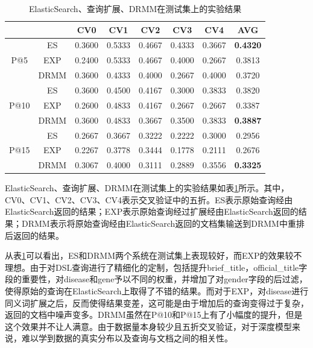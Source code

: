 \documentclass[a4paper]{article}
\begin{document}
\begin{table}[ht]
\centering
\caption{ElasticSearch、查询扩展、DRMM在测试集上的实验结果}\label{tab:results}
\begin{tabular}{cccccccc}\hline
                      &      & CV0    & CV1    & CV2    & CV3    & CV4    & AVG             \\ \hline
\multirow{3}{*}{P@5}  & ES   & 0.3600 & 0.5333 & 0.4667 & 0.4333 & 0.3667 & \textbf{0.4320} \\
                      & EXP  & 0.2400 & 0.5333 & 0.4667 & 0.4000 & 0.2667 & 0.3813          \\
                      & DRMM & 0.3600 & 0.4333 & 0.4000 & 0.2667 & 0.4000 & 0.3720          \\ \hline
\multirow{3}{*}{P@10} & ES   & 0.3600 & 0.4500 & 0.4167 & 0.3000 & 0.3833 & 0.3820          \\
                      & EXP  & 0.2600 & 0.4833 & 0.4167 & 0.2667 & 0.2667 & 0.3387          \\
                      & DRMM & 0.3600 & 0.4833 & 0.3667 & 0.3500 & 0.3833 & \textbf{0.3887} \\ \hline
\multirow{3}{*}{P@15} & ES   & 0.2667 & 0.3667 & 0.3222 & 0.2222 & 0.3000 & 0.2956          \\
                      & EXP  & 0.2267 & 0.3778 & 0.3444 & 0.1778 & 0.2111 & 0.2676          \\
                      & DRMM & 0.3067 & 0.4000 & 0.3111 & 0.2889 & 0.3556 & \textbf{0.3325}\\ \hline
\end{tabular}
\end{table}

ElasticSearch、查询扩展、DRMM在测试集上的实验结果如表\ref{tab:results}所示。其中，CV0、CV1、CV2、CV3、CV4表示交叉验证中的五折。ES表示原始查询经由ElasticSearch返回的结果；EXP表示原始查询经过扩展经由ElasticSearch返回的结果；DRMM表示将原始查询经由ElasticSearch返回的文档集输送到DRMM中重排后返回的结果。

从表\ref{tab:results}可以看出，ES和DRMM两个系统在测试集上表现较好，而EXP的效果较不理想。由于对DSL查询进行了精细化的定制，包括提升brief\_title，official\_title字段的重要性，对disease和gene予以不同的权重，并增加了对gender字段的后过滤，使得原始的查询在ElasticSearch上取得了不错的结果。而对于EXP，对disease进行同义词扩展之后，反而使得结果变差，这可能是由于增加后的查询变得过于复杂，返回的文档中噪声变多。DRMM虽然在P@10和P@15上有了小幅度的提升，但是这个效果并不让人满意。由于数据量本身较少且五折交叉验证，对于深度模型来说，难以学到数据的真实分布以及查询与文档之间的相关性。
\end{document}
